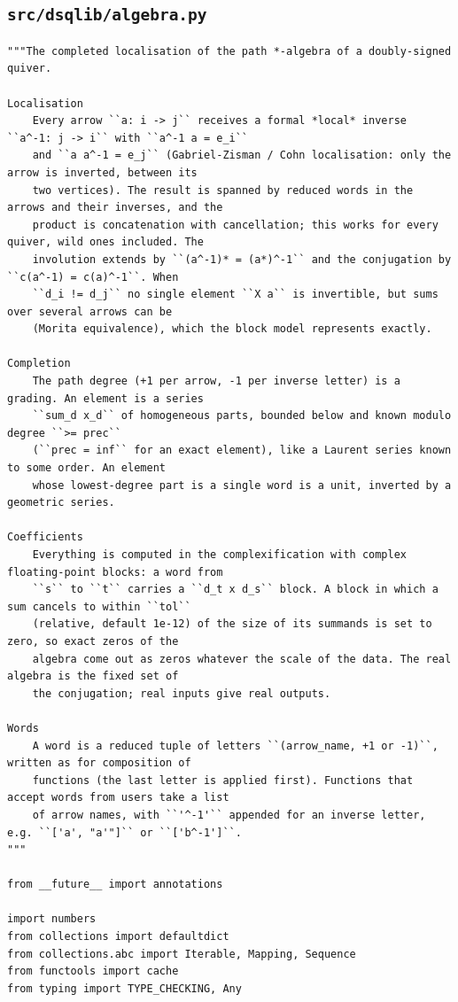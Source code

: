 \documentclass[12pt, a4paper]{report}
\theoremstyle{plain}
\theoremstyle{definition}
\theoremstyle{remark}
\theoremstyle{plain}
\begin{document}
\subsection{\texorpdfstring{\texttt{src/dsqlib/algebra.py}}{src/dsqlib/algebra.py}}
\begin{lstlisting}[style=dsqcode]
"""The completed localisation of the path *-algebra of a doubly-signed quiver.

Localisation
    Every arrow ``a: i -> j`` receives a formal *local* inverse ``a^-1: j -> i`` with ``a^-1 a = e_i``
    and ``a a^-1 = e_j`` (Gabriel-Zisman / Cohn localisation: only the arrow is inverted, between its
    two vertices). The result is spanned by reduced words in the arrows and their inverses, and the
    product is concatenation with cancellation; this works for every quiver, wild ones included. The
    involution extends by ``(a^-1)* = (a*)^-1`` and the conjugation by ``c(a^-1) = c(a)^-1``. When
    ``d_i != d_j`` no single element ``X a`` is invertible, but sums over several arrows can be
    (Morita equivalence), which the block model represents exactly.

Completion
    The path degree (+1 per arrow, -1 per inverse letter) is a grading. An element is a series
    ``sum_d x_d`` of homogeneous parts, bounded below and known modulo degree ``>= prec``
    (``prec = inf`` for an exact element), like a Laurent series known to some order. An element
    whose lowest-degree part is a single word is a unit, inverted by a geometric series.

Coefficients
    Everything is computed in the complexification with complex floating-point blocks: a word from
    ``s`` to ``t`` carries a ``d_t x d_s`` block. A block in which a sum cancels to within ``tol``
    (relative, default 1e-12) of the size of its summands is set to zero, so exact zeros of the
    algebra come out as zeros whatever the scale of the data. The real algebra is the fixed set of
    the conjugation; real inputs give real outputs.

Words
    A word is a reduced tuple of letters ``(arrow_name, +1 or -1)``, written as for composition of
    functions (the last letter is applied first). Functions that accept words from users take a list
    of arrow names, with ``'^-1'`` appended for an inverse letter, e.g. ``['a', "a'"]`` or ``['b^-1']``.
"""

from __future__ import annotations

import numbers
from collections import defaultdict
from collections.abc import Iterable, Mapping, Sequence
from functools import cache
from typing import TYPE_CHECKING, Any


\end{lstlisting}
\end{document}
